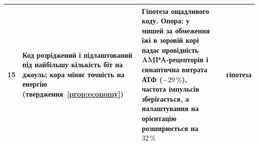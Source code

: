 {\begin{longtable}{>{\raggedright}p{0.5cm}>{\raggedright}p{4.0cm}>{\raggedright}p{5.6cm}>{\raggedright}p{2.3cm}>{\raggedright\arraybackslash}p{1.7cm}}
15 & Код розріджений і підлаштований під найбільшу кількість біт на джоуль; кора міняє точність на енергію (твердження~\ref{prop:economy}) & Гіпотеза ощадливого коду. Опора: у мишей за обмеження їжі в зоровій корі падає провідність AMPA-рецепторів і синаптична витрата АТФ ($-29\,\%$), частота імпульсів зберігається, а налаштування на орієнтацію розширюється на $32\,\%$ & \cite{Barlow1961,Padamsey2022} & гіпотеза \\
\bottomrule
\end{longtable}}
